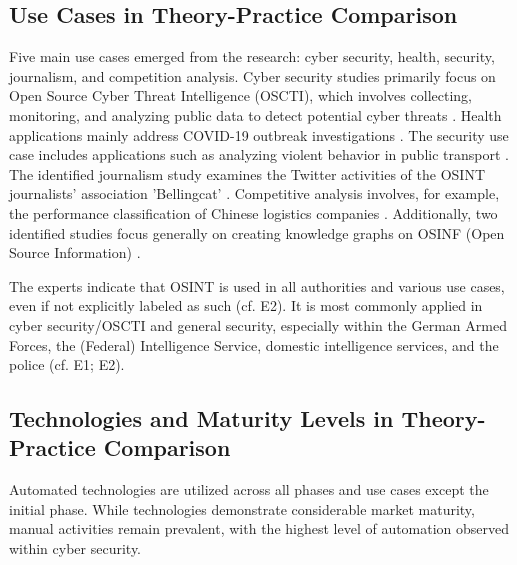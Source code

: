 \documentclass[10pt]{article}
\begin{document}
\subsection{Use Cases in Theory-Practice Comparison}

Five main use cases emerged from the research: cyber security, health, security, journalism,
and competition analysis. Cyber security studies primarily focus on Open Source Cyber Threat
Intelligence (OSCTI), which involves collecting, monitoring, and analyzing public
data to detect potential cyber threats \cite{Ahuja.2022}.
Health applications mainly address COVID-19 outbreak investigations \cite{Kpozehouen.2020}.
The security use case includes applications such as
analyzing violent behavior in public transport \cite{Nobili.2021}. The identified journalism study examines the
Twitter activities of the OSINT journalists' association 'Bellingcat' \cite{Bar.2023}. Competitive analysis
involves, for example, the performance classification of Chinese logistics companies \cite{Tao.2023}.
Additionally, two identified studies focus generally on creating knowledge graphs on OSINF (Open Source Information) \cite{Hu.2023, Ma.2022}.

The experts indicate that OSINT is used in all authorities and various use cases, even if not explicitly labeled as such (cf. E2). It is most commonly applied in cyber security/OSCTI and general security, especially within the German Armed Forces, the (Federal) Intelligence Service, domestic intelligence services, and the police (cf. E1; E2).

\subsection{Technologies and Maturity Levels in Theory-Practice Comparison}

Automated technologies are utilized across all phases and use cases except the initial phase.
While technologies demonstrate considerable market maturity, manual activities remain prevalent, with the highest level of automation observed within cyber security.
\end{document}
